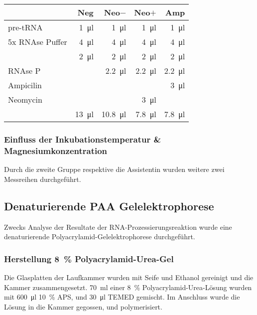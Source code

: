 \documentclass[a4paper,english]{scrreprt}
\begin{document}
\begin{tabu}{lrrrr}
	\toprule
	                & Neg          & Neo$-$         & Neo$+$        & Amp \\
	\midrule
	pre-tRNA        & \SI{1}{\ul}  & \SI{1}{\ul}    & \SI{1}{\ul}   & \SI{1}{\ul} \\
	5x RNAse Puffer & \SI{4}{\ul}  & \SI{4}{\ul}    & \SI{4}{\ul}   & \SI{4}{\ul} \\
	      & \SI{2}{\ul}  & \SI{2}{\ul}    & \SI{2}{\ul}   & \SI{2}{\ul} \\
	RNAse P         &              & \SI{2.2}{\ul}  & \SI{2.2}{\ul} & \SI{2.2}{\ul} \\
	Ampicilin       &              &                &               & \SI{3}{\ul} \\
	Neomycin        &              &                & \SI{3}{\ul}   &             \\
	        & \SI{13}{\ul} & \SI{10.8}{\ul} & \SI{7.8}{\ul} & \SI{7.8}{\ul} \\
	\bottomrule
\end{tabu}

\subsubsection{Einfluss der Inkubationstemperatur \& Magnesiumkonzentration}

Durch die zweite Gruppe respektive die Assistentin wurden weitere zwei
Messreihen durchgeführt.

\subsection{Denaturierende PAA Gelelektrophorese}

Zwecks Analyse der Resultate der RNA-Prozessierungsreaktion wurde eine
denaturierende Polyacrylamid-Gelelektrophorese durchgeführt.

\subsubsection{Herstellung \SI{8}{\percent} Polyacrylamid-Urea-Gel}

Die Glasplatten der Laufkammer wurden mit Seife und Ethanol gereinigt und die
Kammer zusammengesetzt. \SI{70}{\ml} einer \SI{8}{\percent}
Polyacrylamid-Urea-Lösung wurden mit \SI{600}{\ul} \SI{10}{\percent} APS, und
\SI{30}{\ul} TEMED gemischt. Im Anschluss wurde die Lösung in die Kammer
gegossen, und polymerisiert.
\end{document}
